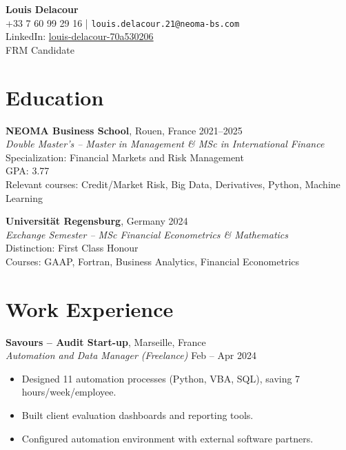 \documentclass[10pt,a4paper]{article}
\begin{document}
\begin{center}
    {\LARGE \textbf{Louis Delacour}} \\
    \vspace{2mm}
    \small
    +33 7 60 99 29 16 \quad | \quad \texttt{louis.delacour.21@neoma-bs.com} \\
    LinkedIn: \href{https://www.linkedin.com/in/louis-delacour-70a530206/}{louis-delacour-70a530206} \\
    FRM Candidate
\end{center}

\vspace{0.05cm}

\section*{Education}
\textbf{NEOMA Business School}, Rouen, France \hfill 2021–2025 \\
\textit{Double Master’s – Master in Management \& MSc in International Finance} \\
Specialization: Financial Markets and Risk Management \\
GPA: 3.77 \\
Relevant courses: Credit/Market Risk, Big Data, Derivatives, Python, Machine Learning 

\textbf{Universität Regensburg}, Germany \hfill 2024 \\
\textit{Exchange Semester – MSc Financial Econometrics \& Mathematics} \\
Distinction: First Class Honour \\
Courses: GAAP, Fortran, Business Analytics, Financial Econometrics

\vspace{0.05cm}

\section*{Work Experience}

\textbf{Savours – Audit Start-up}, Marseille, France \\
\textit{Automation and Data Manager (Freelance)} \hfill Feb – Apr 2024
\begin{itemize}[leftmargin=1.5em, noitemsep]
    \item Designed 11 automation processes (Python, VBA, SQL), saving 7 hours/week/employee.
    \item Built client evaluation dashboards and reporting tools.
    \item Configured automation environment with external software partners.
\end{itemize}
\end{document}
